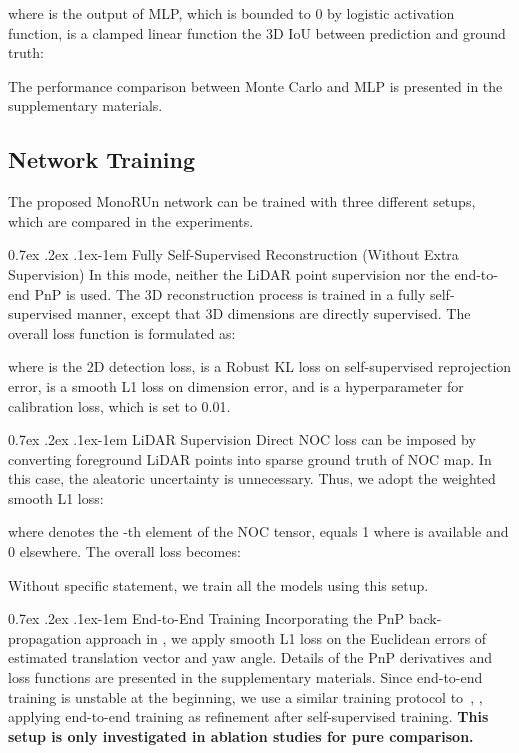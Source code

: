 \documentclass[10pt,twocolumn,letterpaper]{article}
\makeatletter
\renewcommand{\paragraph}{
  \@startsection{paragraph}{4}
  {\z@}{0.7ex \@plus .2ex \@minus .1ex}{-1em}
  {\normalfont\normalsize\bfseries}
}
\makeatother
\begin{document}
where  is the output of MLP, which is bounded to 0 by logistic activation function,  is a clamped linear function \wrt the 3D IoU between prediction and ground truth:

The performance comparison between Monte Carlo and MLP is presented in the supplementary materials.

\subsection{Network Training}
The proposed MonoRUn network can be trained with three different setups, which are compared in the experiments.

\paragraph{Fully Self-Supervised Reconstruction (Without Extra Supervision)} In this mode, neither the LiDAR point supervision nor the end-to-end PnP is used. The 3D reconstruction process is trained in a fully self-supervised manner, except that 3D dimensions are directly supervised. The overall loss function is formulated as:

where  is the 2D detection loss,  is a Robust KL loss on self-supervised reprojection error,  is a smooth L1 loss on dimension error, and  is a hyperparameter for calibration loss, which is set to 0.01. 

\paragraph{LiDAR Supervision} Direct NOC loss can be imposed by converting foreground LiDAR points into sparse ground truth of NOC map. In this case, the aleatoric uncertainty is unnecessary. Thus, we adopt the weighted smooth L1 loss:

where  denotes the -th element of the NOC tensor,  equals 1 where  is available and 0 elsewhere. The overall loss becomes:

Without specific statement, we train all the models using this setup.

\paragraph{End-to-End Training} Incorporating the PnP back-propagation approach in \cite{BPnP}, we apply smooth L1 loss on the Euclidean errors of estimated translation vector and yaw angle. Details of the PnP derivatives and loss functions are presented in the supplementary materials. Since end-to-end training is unstable at the beginning, we use a similar training protocol to~\cite{dsac++}, \ie, applying end-to-end training as refinement after self-supervised training. \textbf{This setup is only investigated in ablation studies for pure comparison.}
\end{document}
